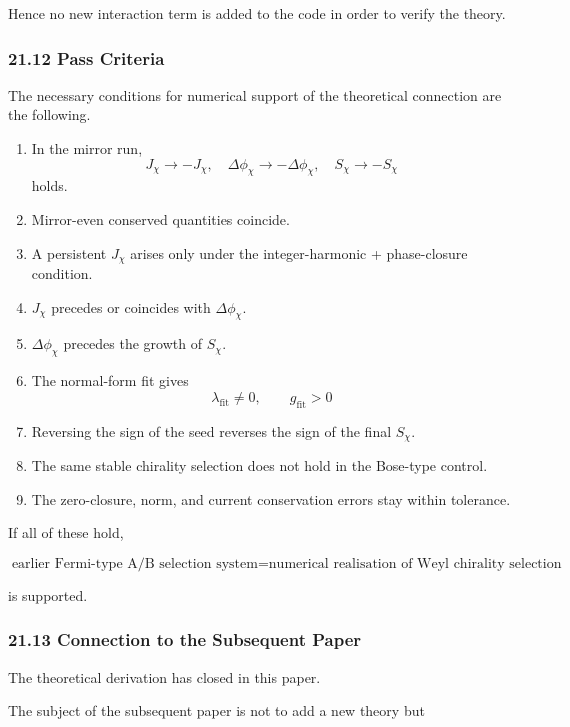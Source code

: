 \documentclass[
  a4paper,
]{article}
\begin{document}
Hence no new interaction term is added to the code in order to verify
the theory.

\subsubsection{21.12 Pass Criteria}\label{pass-criteria}

The necessary conditions for numerical support of the theoretical
connection are the following.

\begin{enumerate}
\def\labelenumi{\arabic{enumi}.}
\item
  In the mirror run, \[
  J_\chi\to-J_\chi,\quad
  \Delta\phi_\chi\to-\Delta\phi_\chi,\quad
  S_\chi\to-S_\chi
  \] holds.
\item
  Mirror-even conserved quantities coincide.
\item
  A persistent \(J_\chi\) arises only under the integer-harmonic +
  phase-closure condition.
\item
  \(J_\chi\) precedes or coincides with \(\Delta\phi_\chi\).
\item
  \(\Delta\phi_\chi\) precedes the growth of \(S_\chi\).
\item
  The normal-form fit gives \[
  \lambda_{\mathrm{fit}}\neq0,
  \qquad
  g_{\mathrm{fit}}>0
  \]
\item
  Reversing the sign of the seed reverses the sign of the final
  \(S_\chi\).
\item
  The same stable chirality selection does not hold in the Bose-type
  control.
\item
  The zero-closure, norm, and current conservation errors stay within
  tolerance.
\end{enumerate}

If all of these hold,

\[
\boxed{
\text{earlier Fermi-type A/B selection system}
=
\text{numerical realisation of Weyl chirality selection}
}
\tag{191}
\]

is supported.

\subsubsection{21.13 Connection to the Subsequent
Paper}\label{connection-to-the-subsequent-paper}

The theoretical derivation has closed in this paper.

The subject of the subsequent paper is not to add a new theory but
\end{document}
